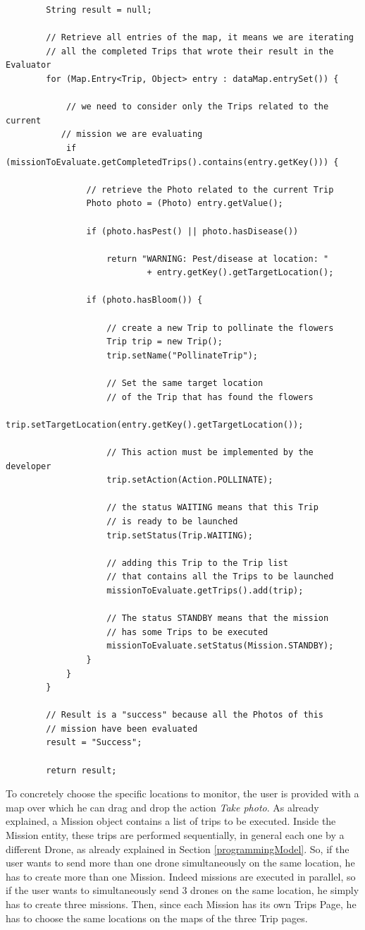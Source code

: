 \begin{lstlisting}
		String result = null;

		// Retrieve all entries of the map, it means we are iterating
        // all the completed Trips that wrote their result in the Evaluator
		for (Map.Entry<Trip, Object> entry : dataMap.entrySet()) {

			// we need to consider only the Trips related to the current
           // mission we are evaluating
			if (missionToEvaluate.getCompletedTrips().contains(entry.getKey())) {
				
				// retrieve the Photo related to the current Trip
				Photo photo = (Photo) entry.getValue();
				
				if (photo.hasPest() || photo.hasDisease())
					
					return "WARNING: Pest/disease at location: "
							+ entry.getKey().getTargetLocation();

				if (photo.hasBloom()) {

					// create a new Trip to pollinate the flowers
					Trip trip = new Trip();
					trip.setName("PollinateTrip");
                    
                    // Set the same target location
                    // of the Trip that has found the flowers
					trip.setTargetLocation(entry.getKey().getTargetLocation());
                    
                    // This action must be implemented by the developer
					trip.setAction(Action.POLLINATE);
                    
                    // the status WAITING means that this Trip
                    // is ready to be launched
					trip.setStatus(Trip.WAITING);

					// adding this Trip to the Trip list
                    // that contains all the Trips to be launched
					missionToEvaluate.getTrips().add(trip);
                    
					// The status STANDBY means that the mission
                    // has some Trips to be executed
					missionToEvaluate.setStatus(Mission.STANDBY);
				}
			}
		}

		// Result is a "success" because all the Photos of this 
        // mission have been evaluated
		result = "Success";
        
		return result;
\end{lstlisting}

To concretely choose the specific locations to monitor, the user is provided with a map over which he can drag and drop the action \textit{Take photo}.
As already explained, a Mission object contains a list of trips to be executed.
Inside the Mission entity, these trips are performed sequentially, in general each one by a different Drone, as already explained in Section \ref{programmingModel}.
So, if the user wants to send more than one drone simultaneously on the same location, he has to create more than one Mission.
Indeed missions are executed in parallel, so if the user wants to simultaneously send 3 drones on the same location, he simply has to create three missions.
Then,  since each Mission has its own Trips Page, he has to choose the same locations on the maps of the three Trip pages.
\\

